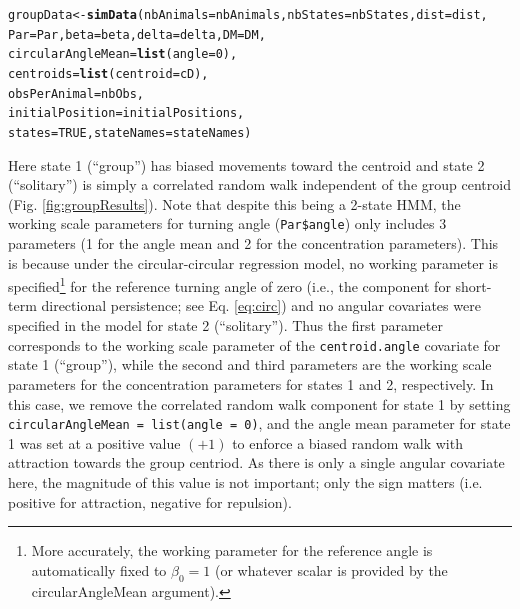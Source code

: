 \documentclass[12pt]{article}\usepackage[]{graphicx}\usepackage[]{xcolor}
\makeatletter
\newcommand{\hlnum}[1]{\textcolor[rgb]{0.686,0.059,0.569}{#1}}%
\newcommand{\hldef}[1]{\textcolor[rgb]{0.345,0.345,0.345}{#1}}%
\newcommand{\hlkwb}[1]{\textcolor[rgb]{0.69,0.353,0.396}{#1}}%
\newcommand{\hlkwc}[1]{\textcolor[rgb]{0.333,0.667,0.333}{#1}}%
\newcommand{\hlkwd}[1]{\textcolor[rgb]{0.737,0.353,0.396}{\textbf{#1}}}%
\newenvironment{kframe}{%
 \def\at@end@of@kframe{}%
 \ifinner\ifhmode%
  \def\at@end@of@kframe{\end{minipage}}%
  \begin{minipage}{\columnwidth}%
 \fi\fi%
 \def\FrameCommand##1{\hskip\@totalleftmargin \hskip-\fboxsep
 \colorbox{shadecolor}{##1}\hskip-\fboxsep
     \hskip-\linewidth \hskip-\@totalleftmargin \hskip\columnwidth}%
 \MakeFramed {\advance\hsize-\width
   \@totalleftmargin\z@ \linewidth\hsize
   \@setminipage}}%
 {\par\unskip\endMakeFramed%
 \at@end@of@kframe}
\newenvironment{knitrout}{}{} %
\makeatother
\begin{document}
\begin{knitrout}
\begin{kframe}
\begin{alltt}
\hldef{groupData} \hlkwb{<-} \hlkwd{simData}\hldef{(}\hlkwc{nbAnimals}\hldef{=nbAnimals,} \hlkwc{nbStates}\hldef{=nbStates,} \hlkwc{dist}\hldef{=dist,}
                     \hlkwc{Par} \hldef{= Par,} \hlkwc{beta} \hldef{= beta,} \hlkwc{delta} \hldef{= delta,} \hlkwc{DM} \hldef{= DM,}
                     \hlkwc{circularAngleMean} \hldef{=} \hlkwd{list}\hldef{(}\hlkwc{angle} \hldef{=} \hlnum{0}\hldef{),}
                     \hlkwc{centroids} \hldef{=} \hlkwd{list}\hldef{(}\hlkwc{centroid} \hldef{= cD),}
                     \hlkwc{obsPerAnimal} \hldef{= nbObs,}
                     \hlkwc{initialPosition} \hldef{= initialPositions,}
                     \hlkwc{states} \hldef{=} \hlnum{TRUE}\hldef{,} \hlkwc{stateNames} \hldef{= stateNames)}
\end{alltt}
\end{kframe}
\end{knitrout}
\noindent Here state 1 (``group'') has biased movements toward the centroid and state 2 (``solitary'') is simply a correlated random walk independent of the group centroid (Fig. \ref{fig:groupResults}).  Note that despite this being a 2-state HMM, the working scale parameters for turning angle (\verb|Par$angle|) only includes 3 parameters (1 for the angle mean and 2 for the concentration parameters).  This is because under the circular-circular regression model, no working parameter is specified\footnote{More accurately, the working parameter for the reference angle is automatically fixed to $\beta_0=1$ (or whatever scalar is provided by the circularAngleMean argument).} for the reference turning angle of zero (i.e., the component for short-term directional persistence; see Eq. \ref{eq:circ}) and no angular covariates were specified in the model for state 2 (``solitary''). Thus the first parameter corresponds to the working scale parameter of the \verb|centroid.angle| covariate for state 1 (``group''), while the second and third parameters are the working scale parameters for the concentration parameters for states 1 and 2, respectively.  In this case, we remove the correlated random walk component for state 1 by setting \verb|circularAngleMean = list(angle = 0)|, and the angle mean parameter for state 1 was set at a positive value $(+1)$ to enforce a biased random walk with attraction towards the group centriod. As there is only a single angular covariate here, the magnitude of this value is not important; only the sign matters (i.e. positive for attraction, negative for repulsion).
\end{document}
